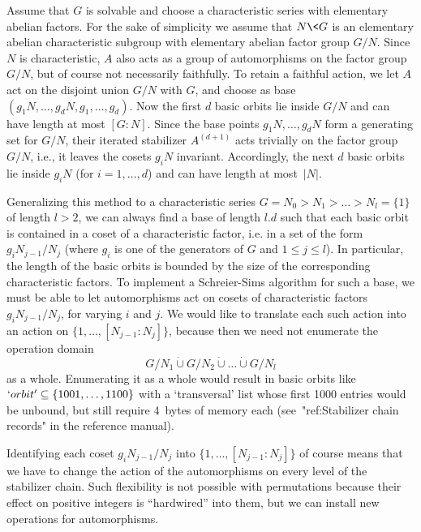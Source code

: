Assume that   $G$ is solvable  and  choose  a  characteristic series with
elementary abelian factors. For the sake of  simplicity we assume that $N
\< G$ is an   elementary abelian characteristic subgroup  with elementary
abelian factor group $G/N$. Since $N$ is characteristic, $A$ also acts as
a group of automorphisms  on the factor  group $G/N$,  but of course  not
necessarily  faithfully. To retain  a faithful action,  we let $A$ act on
the   disjoint   union   $G/N$   with   $G$,   and   choose    as    base
$(g_1N,\ldots,g_dN,g_1,\ldots,g_d)$. Now the first $d$ basic  orbits  lie
inside $G/N$ and can have length at most $[G\mathbin:N]$. Since the  base
points $g_1N,\ldots,  g_dN$  form  a  generating  set  for  $G/N$,  their
iterated stabilizer $A^{(d+1)}$ acts trivially on the factor group $G/N$,
i.e., it leaves the cosets $g_iN$ invariant. Accordingly,  the  next  $d$
basic orbits lie inside $g_iN$ (for $i=1,\ldots,d$) and can  have  length
at most~$|N|$.

Generalizing this method to a characteristic series $G=N_0 > N_1 > \ldots
> N_l=\{1\}$ of length $l>2$, we  can always find  a base of length $l.d$
such that each  basic orbit is  contained in a  coset of a characteristic
factor, i.e. in a set of the form $g_iN_{j-1}/N_j$ (where $g_i$ is one of
the generators  of $G$ and $1\le j\le  l$). In particular, the  length of
the basic  orbits   is  bounded   by  the  size  of    the  corresponding
characteristic factors. To implement a Schreier-Sims algorithm for such a
base, we  must  be   able  to  let   automorphisms  act  on   cosets   of
characteristic  factors $g_iN_{j-1}/N_j$, for  varying  $i$  and $j$.  We
would    like to    translate each such     action  into  an  action   on
$\{1,\ldots,[N_{j-1}\mathbin: N_j]\}$, because then we need not enumerate
the operation domain
$$
   G/N_1 \mathbin{\dot\cup} G/N_2 \mathbin{\dot\cup} \ldots %
         \mathbin{\dot\cup} G/N_l 
$$
as a whole. Enumerating it  as a whole would result  in basic orbits like
$`orbit'\subseteq \{1001,\ldots,1100\}$  with a  `transversal' list whose
first 1000 entries would be unbound, but  still require 4~bytes of memory
each (see~"ref:Stabilizer chain records" in the reference manual).

Identifying   each  coset   $g_iN_{j-1}/N_j$ into   $\{1,\ldots, [N_{j-1}
\mathbin: N_j]\}$ of  course means that we have  to change the action  of
the automorphisms on     every  level of   the  stabilizer   chain.  Such
flexibility is not   possible with permutations  because their  effect on
positive  integers  is ``hardwired''  into them,  but  we can install new
operations for automorphisms.

